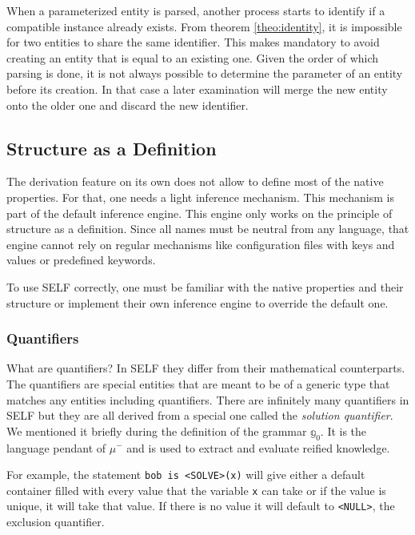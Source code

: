 \documentclass[11pt,a4paper,twoside,openright,titlepage,numbers=noenddot,headinclude,cleardoublepage=empty,openany]{scrreprt}
\theoremstyle{plain}
\theoremstyle{definition}
\theoremstyle{remark}
\newcommand{\passthrough}[1]{#1}
\newcommand{\bb}{\mathbb}
\begin{document}
When a parameterized entity is parsed, another process starts to
identify if a compatible instance already exists. From
theorem \ref{theo:identity}, it is impossible for two entities to share
the same identifier. This makes mandatory to avoid creating an entity
that is equal to an existing one. Given the order of which parsing is
done, it is not always possible to determine the parameter of an entity
before its creation. In that case a later examination will merge the new
entity onto the older one and discard the new identifier.

\hypertarget{structure-as-a-definition}{%
\subsection{Structure as a Definition}\label{structure-as-a-definition}}

The derivation feature on its own does not allow to define most of the
native properties. For that, one needs a light inference mechanism. This
mechanism is part of the default inference engine. This engine only
works on the principle of structure as a definition. Since all names
must be neutral from any language, that engine cannot rely on regular
mechanisms like configuration files with keys and values or predefined
keywords.

To use SELF correctly, one must be familiar with the native properties
and their structure or implement their own inference engine to override
the default one.

\hypertarget{sec:quantifier}{%
\subsubsection{Quantifiers}\label{sec:quantifier}}

What are quantifiers? In SELF they differ from their mathematical
counterparts. The quantifiers are special entities that are meant to be
of a generic type that matches any entities including quantifiers. There
are infinitely many quantifiers in SELF but they are all derived from a
special one called the \emph{solution quantifier}. We mentioned it
briefly during the definition of the grammar \(\bb{g}_0\). It is the
language pendant of \(\mu^-\) and is used to extract and evaluate
reified knowledge.

For example, the statement \passthrough{\lstinline!bob is <SOLVE>(x)!}
will give either a default container filled with every value that the
variable \passthrough{\lstinline!x!} can take or if the value is unique,
it will take that value. If there is no value it will default to
\passthrough{\lstinline!<NULL>!}, the exclusion quantifier.
\end{document}
